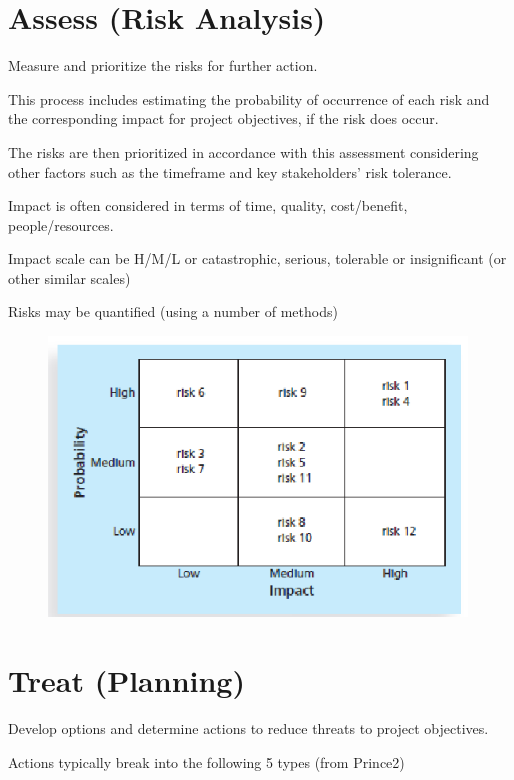 \documentclass[]{project_plan}
\begin{document}
\newpage

\section{Assess (Risk Analysis)}
Measure and prioritize the risks for further action.

This process includes estimating the probability of
occurrence of each risk and the corresponding
impact for project objectives, if the risk does occur.

The risks are then prioritized in accordance with
this assessment considering other factors such as
the timeframe and key stakeholders’ risk tolerance.

Impact is often considered in terms of time,
quality, cost/benefit, people/resources.

Impact scale can be H/M/L or catastrophic, serious,
tolerable or insignificant (or other similar scales)

Risks may be quantified (using a number of
methods)

\begin{figure}[h!]
  \centering
  \includegraphics[width=30em]{risk_analysis_matrix.png}
\end{figure}

\newpage

\section{Treat (Planning)}
Develop options and determine actions to reduce threats to project
objectives.

Actions typically break into the following 5 types (from Prince2)
\end{document}
